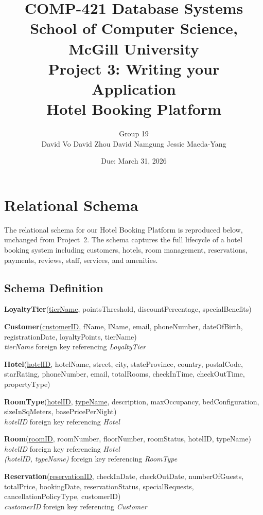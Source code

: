 \documentclass[12pt,letterpaper]{article}
\title{
    \vspace{-1cm}
    \textbf{COMP-421 Database Systems}\\[0.3em]
    \large School of Computer Science, McGill University\\[0.5em]
    \LARGE\textbf{Project 3: Writing your Application}\\[0.3em]
    \large Hotel Booking Platform
}
\author{
    Group 19\\
    David Vo \quad David Zhou \quad David Namgung \quad Jessie Maeda-Yang
}
\date{Due: March 31, 2026}
\begin{document}
\maketitle
\tableofcontents
\newpage

\section{Relational Schema}

The relational schema for our Hotel Booking Platform is reproduced below, unchanged from Project~2. The schema captures the full lifecycle of a hotel booking system including customers, hotels, room management, reservations, payments, reviews, staff, services, and amenities.

\subsection*{Schema Definition}

\textbf{LoyaltyTier}(\underline{tierName}, pointsThreshold, discountPercentage, specialBenefits)

\textbf{Customer}(\underline{customerID}, fName, lName, email, phoneNumber, dateOfBirth, registrationDate, loyaltyPoints, tierName)\\
\textit{tierName} foreign key referencing \textit{LoyaltyTier}

\textbf{Hotel}(\underline{hotelID}, hotelName, street, city, stateProvince, country, postalCode, starRating, phoneNumber, email, totalRooms, checkInTime, checkOutTime, propertyType)

\textbf{RoomType}(\underline{hotelID}, \underline{typeName}, description, maxOccupancy, bedConfiguration, sizeInSqMeters, basePricePerNight)\\
\textit{hotelID} foreign key referencing \textit{Hotel}

\textbf{Room}(\underline{roomID}, roomNumber, floorNumber, roomStatus, hotelID, typeName)\\
\textit{hotelID} foreign key referencing \textit{Hotel}\\
\textit{(hotelID, typeName)} foreign key referencing \textit{RoomType}

\textbf{Reservation}(\underline{reservationID}, checkInDate, checkOutDate, numberOfGuests, totalPrice, bookingDate, reservationStatus, specialRequests, cancellationPolicyType, customerID)\\
\textit{customerID} foreign key referencing \textit{Customer}
\end{document}
